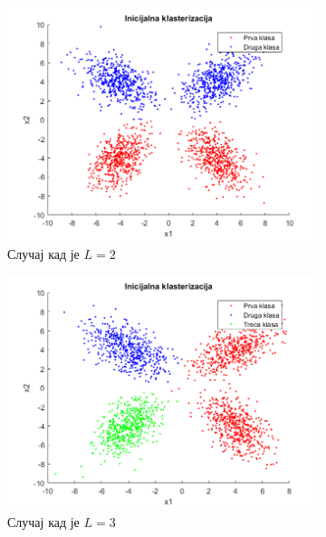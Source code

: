 \begin{figure}[htb!]\caption{Крајња кластеризација}
\begin{subfigure}{.6\textwidth}
\centering
\includegraphics[width=1\textwidth]{pictures/4/CMean2Final}
\caption{Случај кад је $L=2$}\label{pic:cMean2Final}
\end{subfigure}
\begin{subfigure}{.55\textwidth}
\centering
\includegraphics[width=1\linewidth]{pictures/4/CMean3Final}
\caption{Случај кад је $L=3$}\label{pic:cMean3Final}
\end{subfigure}
\bigskip
\begin{subfigure}{.55\textwidth}
\centering

\end{subfigure}
\end{figure}
